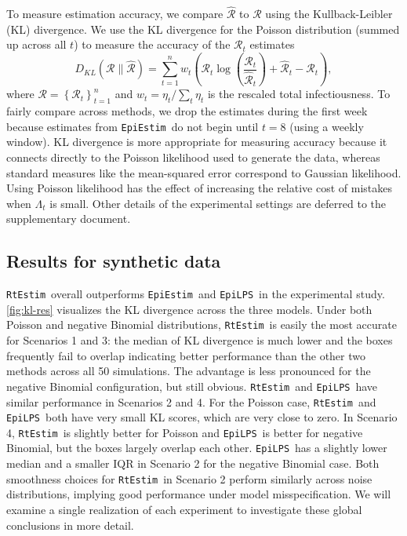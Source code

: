 \documentclass[10pt,letterpaper]{article}
\newcommand{\lr}[1]{\left(#1\right)}
\def\RtEstim{\texttt{RtEstim}}
\def\EpiEstim{\texttt{EpiEstim}}
\def\EpiLPS{\texttt{EpiLPS}}
\def\calR{\mathcal{R}}
\begin{document}
To measure estimation accuracy, we compare $\widehat{\calR}$ to $\calR$ using
the Kullback-Leibler (KL) divergence. We use the KL divergence for the
Poisson distribution (summed up across all $t$) to measure the accuracy
of the $\calR_t$ estimates 
$$D_{KL}(\calR \parallel \widehat{\calR}) = \sum_{t=1}^n w_t \lr{\calR_t
\log\left(\frac{\calR_t} {\widehat{\calR}_t}\right) + \widehat{\calR}_t -
{\calR}_t},$$ where $\calR = \left\{ \calR_t \right\}_{t=1}^n$ and $w_t = \eta_t
/ \sum_t \eta_t$ is the rescaled total infectiousness. To fairly compare across
methods, we drop the estimates during the first week because estimates from
\EpiEstim\ do not begin until $t=8$ (using a weekly window). KL divergence is
more appropriate for measuring accuracy because it connects directly to the
Poisson likelihood used to generate the data, whereas standard measures like the
mean-squared error correspond to Gaussian likelihood. Using Poisson likelihood
has the effect of increasing the relative cost of mistakes when $\Lambda_t$ is
small. Other details of the experimental settings are deferred to the 
supplementary document. 


\subsection{Results for synthetic data}

\RtEstim\ overall outperforms \EpiEstim\ and \EpiLPS\ in the experimental study.
\autoref{fig:kl-res} visualizes the KL divergence across the three models. Under
both Poisson and negative Binomial distributions, \RtEstim\ is easily the most
accurate for Scenarios 1 and 3: the median of KL divergence is much lower and
the boxes frequently fail to overlap indicating better performance than the
other two methods across all 50 simulations. The advantage is less pronounced
for the negative Binomial configuration, but still obvious.
\RtEstim\ and \EpiLPS\ have similar performance in Scenarios 2 and 4. For the
Poisson case, \RtEstim\ and \EpiLPS\ both have very small KL scores, which are
very close to zero. In Scenario 4, \RtEstim\ is slightly better for Poisson and
\EpiLPS\ is better for negative Binomial, but the boxes largely overlap each
other. \EpiLPS\ has a slightly lower median and a smaller IQR in Scenario 2 for
the negative Binomial case. Both smoothness choices for \RtEstim\ in Scenario 2
perform similarly across noise distributions, implying good performance under model misspecification. We will examine a single realization of each
experiment to investigate these global conclusions in more detail.
\end{document}

